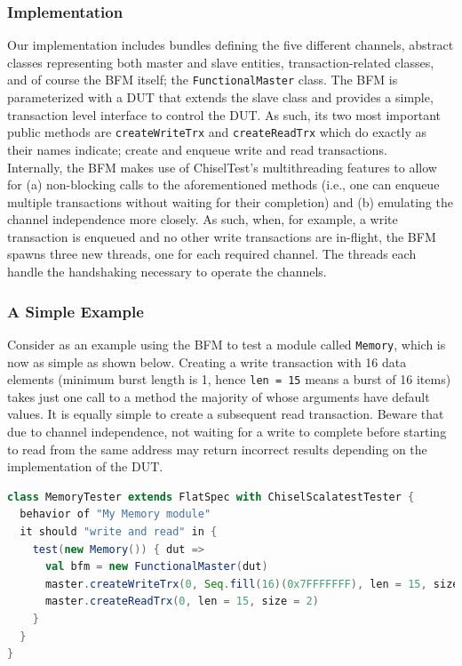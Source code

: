\documentclass[runningheads]{llncs}
\begin{document}
\subsubsection{Implementation}
Our implementation includes bundles defining the five different channels, abstract classes representing both master and slave entities, transaction-related classes, and of course the BFM itself; the \texttt{FunctionalMaster} class. The BFM is parameterized with a DUT that extends the slave class and provides a simple, transaction level interface to control the DUT. As such, its two most important public methods are \texttt{createWriteTrx} and \texttt{createReadTrx} which do exactly as their names indicate; create and enqueue write and read transactions. \\

Internally, the BFM makes use of ChiselTest's multithreading features to allow for (a) non-blocking calls to the aforementioned methods (i.e., one can enqueue multiple transactions without waiting for their completion) and (b) emulating the channel independence more closely. As such, when, for example, a write transaction is enqueued and no other write transactions are in-flight, the BFM spawns three new threads, one for each required channel. The threads each handle the handshaking necessary to operate the channels.

\subsubsection{A Simple Example}
Consider as an example using the BFM to test a module called \texttt{Memory}, which is now as simple as shown below. Creating a write transaction with 16 data elements (minimum burst length is 1, hence \texttt{len = 15} means a burst of 16 items) takes just one call to a method the majority of whose arguments have default values. It is equally simple to create a subsequent read transaction. Beware that due to channel independence, not waiting for a write to complete before starting to read from the same address may return incorrect results depending on the implementation of the DUT.
\begin{lstlisting}[language=scala, caption={Using the AXI4 BFM with ChiselTest}, label={lst:axitest}]
class MemoryTester extends FlatSpec with ChiselScalatestTester {
  behavior of "My Memory module"
  it should "write and read" in {
    test(new Memory()) { dut =>
      val bfm = new FunctionalMaster(dut)
      master.createWriteTrx(0, Seq.fill(16)(0x7FFFFFFF), len = 15, size = 2)
      master.createReadTrx(0, len = 15, size = 2)
    }
  }
}
\end{lstlisting}
\end{document}

